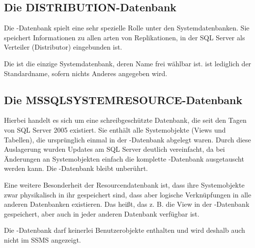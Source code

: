       \subsection{Die DISTRIBUTION-Datenbank}
        Die -Datenbank spielt eine sehr spezielle Rolle
        unter den Systemdatenbanken. Sie speichert Informationen zu allen arten
        von Replikationen, in der SQL Server als Verteiler
        (Distributor) eingebunden ist.
        
        Die  ist die einzige Systemdatenbank, deren
        Name frei wählbar ist.  ist lediglich der
        Standardname, sofern nichts Anderes angegeben wird.
          \begin{literaturinternet}
            \item \cite{ms183524}
          \end{literaturinternet}          
      \subsection{Die MSSQLSYSTEMRESOURCE-Datenbank}
        Hierbei handelt es sich um eine schreibgeschützte Datenbank, die seit
        den Tagen von SQL Server 2005 existiert. Sie enthält alle Systemobjekte
        (Views und Tabellen), die ursprünglich einmal in der
        -Datenbank abgelegt waren. Durch diese Auslagerung
        wurden Updates am SQL Server deutlich vereinfacht, da bei Änderungen an
        Systemobjekten einfach die komplette
        -Datenbank ausgetauscht werden kann. Die
        -Datenbank bleibt unberührt.
        
        Eine weitere Besonderheit der Resourcendatenbank ist, dass ihre
        Systemobjekte zwar physikalisch in ihr gespeichert sind, dass aber
        logische Verknüpfungen in alle anderen Datenbanken existieren. Das
        heißt, das z. B. die View  in der
        -Datenbank gespeichert, aber auch in
        jeder anderen Datenbank verfügbar ist.
        \begin{merke}
          Die -Datenbank darf keinerlei
          Benutzerobjekte enthalten und wird deshalb auch nicht im SSMS
          angezeigt.
        \end{merke}

